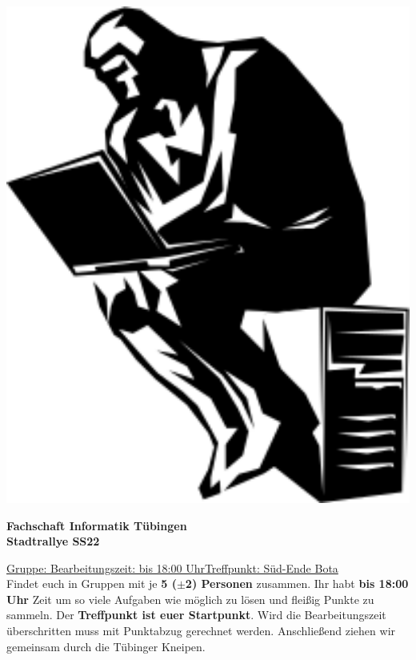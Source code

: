 \documentclass[11pt,paper=a4,answers]{exam}
\newcommand{\semester}{SS22}
\newcommand{\bearbeitungszeit}{bis 18:00 Uhr}
\newcommand{\treffpunkt}{Süd-Ende Bota}
\begin{document}
	
\noindent
\begin{minipage}[l]{.1\textwidth}
\noindent
\includegraphics[width=1.5\textwidth]{graphics/denker}
\end{minipage}
\begin{minipage}[r]{.8\textwidth}
\begin{center}
{\large \bfseries Fachschaft Informatik Tübingen \\
\Large Stadtrallye \semester \par}
\end{center}
\end{minipage}
\par
\vspace{0.5cm}
\noindent
\uline{Gruppe:\hspace{2cm} \hfill Bearbeitungszeit: \bearbeitungszeit   \hfill     Treffpunkt: \treffpunkt}
\vspace{0.5cm}\\
Findet euch in Gruppen mit je \textbf{5 ($\pm$2) Personen} zusammen. Ihr habt \textbf{\bearbeitungszeit} Zeit um so viele Aufgaben wie möglich zu lösen und fleißig Punkte zu sammeln. Der \textbf{Treffpunkt ist euer Startpunkt}. Wird die Bearbeitungszeit überschritten muss mit Punktabzug gerechnet werden. Anschließend ziehen wir gemeinsam durch die Tübinger Kneipen. 
\end{document}
